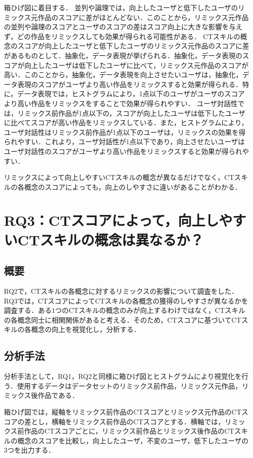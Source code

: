\documentclass[11pt]{jreport}
\begin{document}
箱ひげ図に着目する．
並列や論理では，向上したユーザと低下したユーザのリミックス元作品のスコアに差がほとんどない．このことから，リミックス元作品の並列や論理のスコアとユーザのスコアの差はスコア向上に大きな影響を与えず，どの作品をリミックスしても効果が得られる可能性がある．
CTスキルの概念のスコアが向上したユーザと低下したユーザのリミックス元作品のスコアに差があるものとして．抽象化，データ表現が挙げられる．抽象化，データ表現のスコアが向上したユーザは低下したユーザに比べて，リミックス元作品のスコアが高い．このことから，抽象化，データ表現を向上させたいユーザは，抽象化，データ表現のスコアがユーザより高い作品をリミックスすると効果が得られる．特に，データ表現では，ヒストグラムにより，1点以下のユーザがユーザのスコアより高い作品をリミックスをすることで効果が得られやすい．
ユーザ対話性では，リミックス前作品が1点以下の，スコアが向上したユーザは低下したユーザに比べてスコアが高い作品をリミックスしている．また，ヒストグラムにより，ユーザ対話性はリミックス前作品が1点以下のユーザは，リミックスの効果を得られやすい．これより，ユーザ対話性が1点以下であり，向上させたいユーザはユーザ対話性のスコアがユーザより高い作品をリミックスすると効果が得られやすい．

リミックスによって向上しやすいCTスキルの概念が異なるだけでなく，CTスキルの各概念のスコアによっても，向上のしやすさに違いがあることがわかる．



\chapter{RQ3：CTスコアによって，向上しやすいCTスキルの概念は異なるか？}
\section{概要}
RQ2で，CTスキルの各概念に対するリミックスの影響について調査をした．RQ3では，CTスコアによってCTスキルの各概念の獲得のしやすさが異なるかを調査する．ある1つのCTスキルの概念のみが向上するわけではなく，CTスキルの各概念同士に相関関係があると考える．そのため，CTスコアに基づいてCTスキルの各概念の向上を視覚化し，分析する．

\section{分析手法}
分析手法として，RQ1，RQ2と同様に箱ひげ図とヒストグラムにより視覚化を行う．使用するデータはデータセットのリミックス前作品，リミックス元作品，リミックス後作品である．

箱ひげ図では，縦軸をリミックス前作品のCTスコアとリミックス元作品のCTスコアの差とし，横軸をリミックス前作品のCTスコアとする．横軸では，リミックス前作品のCTスコアごとに，リミックス前作品とリミックス後作品のCTスキルの概念のスコアを比較し，向上したユーザ，不変のユーザ，低下したユーザの3つを出力する．
\end{document}
